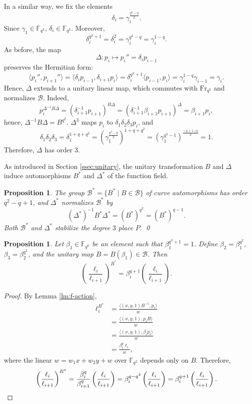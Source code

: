 \documentclass[11pt]{amsart}
\theoremstyle{plain}
\newtheorem{proposition}[theorem]{Proposition}
\theoremstyle{definition}
\theoremstyle{remark}
\newcommand{\Frob}{{\mathrm{Fr}_{q^2}}}
\begin{document}
In a similar way, we fix the elements 
\[\delta_i=\gamma_i^\frac{q^3-q}{2}.\] %
Since $\gamma_1 \in \mathbb{F}_{q^3}$, $\delta_{i}\in \mathbb{F}_{q^3}$. Moreover,
\[\delta_i^{q^3+1}=\delta_i^2=\gamma_i^{q^3-q}=\gamma_i^{1-q}.\] 
As before, the map 
\[\Delta:p_i\mapsto p_i''=\delta_i p_{i-1}\]
preserves the Hermitian form:
\[\langle p_i'',p_{i+1}'' \rangle = \langle \delta_{i} p_{i-1}, \delta_{i+1} p_{i} \rangle = \delta_{i}^{q^3+1} \langle p_{i-1},p_{i} \rangle = \gamma_i^{1-q} \gamma_{i-1} =\gamma_i.\]
Hence, $\Delta$ extends to a unitary linear map, which commutes with $\Frob$ and normalizes $\mathcal{B}$. Indeed,
\[ p_{i}^{\Delta^{-1}B\Delta} = (\delta_{i+1}^{-1}p_{i+1})^{B\Delta} = (\delta_{i+1}^{-1}\beta_{i+1} p_{i+1})^\Delta = \beta_{i+1} p_i, \]
hence, $\Delta^{-1}B\Delta=B^{q^2}$. $\Delta^3$ maps $p_i$ to $\delta_1\delta_2\delta_3 p_i$, and
\[\delta_1\delta_2\delta_3=\delta_1^{1+q+q^2}=\left(\gamma_1^\frac{q^3-q}{2}\right)^{1+q+q^2}= \left(\gamma_1^{q^3-1}\right)^\frac{(q+1)q}{2}=1.\]
Therefore, $\Delta$ has order $3$. 

As introduced in Section \ref{ssec:unitary}, the unitary transformation $B$ and $\Delta$ induce automorphisms $B^*$ and $\Delta^*$ of the function field. 
\begin{proposition}
The group $\mathcal{B}^* = \{B^* \mid B \in \mathcal{B}\}$ of curve automorphisms has order $q^2-q+1$, and $\Delta^*$ normalizes $\mathcal{B}^*$ by 
\[(\Delta^*)^{-1}B^*\Delta^*=(B^*)^{q^2}=(B^*)^{q-1}.\]
Both $\mathcal{B}^*$ and $\Delta^*$ stabilize the degree $3$ place $P$. \qed
\end{proposition}

\begin{proposition} \label{pr:B-star-elli} 
Let $\beta_1 \in \mathbb{F}_{q^6}$ be an element such that $\beta_1^{q^3+1}=1$. Define $\beta_2=\beta_1^{q^2}$, $\beta_3=\beta_2^{q^2}$, and the unitary map $B=B(\beta_1) \in \mathcal{B}$. Then 
\[\left(\frac{\ell_i}{\ell_{i+1}}\right)^{B^*} = \beta_i^{q+1}\left(\frac{\ell_i}{\ell_{i+1}}\right).\]
\end{proposition}
\begin{proof}
By Lemma \ref{lm:f-action},
\begin{align*}
\ell_i^{B^*} & = \frac{\langle (x,y,1)B^{-1}, p_i \rangle }{w} \\
&= \frac{\langle (x,y,1), p_i B \rangle }{w} \\
&= \frac{\langle (x,y,1), \beta_i p_i \rangle }{w} \\
&= \frac{\beta_i^q \ell_i}{w},
\end{align*}
where the linear $w=w_1x+w_2y+w$ over $\mathbb{F}_{q^2}$ depends only on $B$. Therefore,
\[\left(\frac{\ell_i}{\ell_{i+1}}\right)^{B^*} = \frac{\beta_i^q}{\beta_{i+1}^q}\left(\frac{\ell_i}{\ell_{i+1}}\right) = \beta_i^{q-q^3}\left(\frac{\ell_i}{\ell_{i+1}}\right) = \beta_i^{q+1}\left(\frac{\ell_i}{\ell_{i+1}}\right). \qedhere\]
\end{proof}
\end{document}
